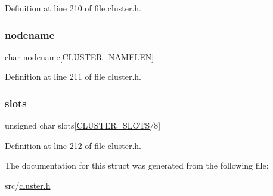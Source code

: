 Definition at line 210 of file cluster.\+h.

\mbox{\label{structcluster_msg_data_update_a50eb514a773ea3e78ec45e62fc0d7b9f}} 
\subsubsection{\texorpdfstring{nodename}{nodename}}
{\footnotesize\ttfamily char nodename\mbox{[}\hyperlink{cluster_8h_ace7a882972eff7149675252938643b6e}{C\+L\+U\+S\+T\+E\+R\+\_\+\+N\+A\+M\+E\+L\+EN}\mbox{]}}



Definition at line 211 of file cluster.\+h.

\mbox{\label{structcluster_msg_data_update_a5860192f55932c04b85ec15307ee114b}} 
\subsubsection{\texorpdfstring{slots}{slots}}
{\footnotesize\ttfamily unsigned char slots\mbox{[}\hyperlink{cluster_8h_aa3e2cb951eebb16725ecc3f5beefd9fd}{C\+L\+U\+S\+T\+E\+R\+\_\+\+S\+L\+O\+TS}/8\mbox{]}}



Definition at line 212 of file cluster.\+h.



The documentation for this struct was generated from the following file\+:\begin{DoxyCompactItemize}
\item 
src/\hyperlink{cluster_8h}{cluster.\+h}\end{DoxyCompactItemize}
